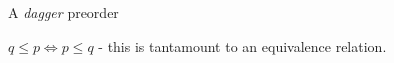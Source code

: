 

A \emph{dagger} preorder

$q \leq p \iff p \leq q$ - this is tantamount to an equivalence relation.